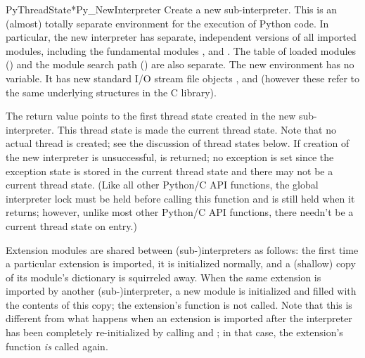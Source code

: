 \begin{cfuncdesc}{PyThreadState*}{Py_NewInterpreter}{}
  Create a new sub-interpreter.  This is an (almost) totally separate
  environment for the execution of Python code.  In particular, the
  new interpreter has separate, independent versions of all imported
  modules, including the fundamental modules
  ,
   and
  .  The table of loaded modules
  () and the module search path ()
  are also separate.  The new environment has no 
  variable.  It has new standard I/O stream file objects
  ,  and  (however
  these refer to the same underlying  structures in the C
  library).

  The return value points to the first thread state created in the new
  sub-interpreter.  This thread state is made the current thread
  state.  Note that no actual thread is created; see the discussion of
  thread states below.  If creation of the new interpreter is
  unsuccessful, \NULL{} is returned; no exception is set since the
  exception state is stored in the current thread state and there may
  not be a current thread state.  (Like all other Python/C API
  functions, the global interpreter lock must be held before calling
  this function and is still held when it returns; however, unlike
  most other Python/C API functions, there needn't be a current thread
  state on entry.)

  Extension modules are shared between (sub-)interpreters as follows:
  the first time a particular extension is imported, it is initialized
  normally, and a (shallow) copy of its module's dictionary is
  squirreled away.  When the same extension is imported by another
  (sub-)interpreter, a new module is initialized and filled with the
  contents of this copy; the extension's  function is not
  called.  Note that this is different from what happens when an
  extension is imported after the interpreter has been completely
  re-initialized by calling
   and
  ; in that case,
  the extension's  function \emph{is} called
  again.


\end{cfuncdesc}

